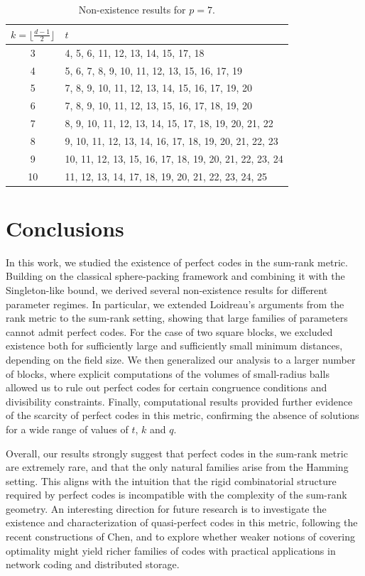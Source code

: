 \documentclass[11pt]{amsart}
\theoremstyle{definition}
\begin{document}
\begin{table}[ht] 
    \centering
\begin{tabular}{|c|p{}|}
	\hline
	$k=\lfloor \frac{d-1}2\rfloor$ & $t$ \\
	\hline
	3 & 4, 5, 6, 11, 12, 13, 14, 15, 17, 18 \\
	\hline
	4 & 5, 6, 7, 8, 9, 10, 11, 12, 13, 15, 16, 17, 19 \\
	\hline
	5 & 7, 8, 9, 10, 11, 12, 13, 14, 15, 16, 17, 19, 20 \\
	\hline
	6 & 7, 8, 9, 10, 11, 12, 13, 15, 16, 17, 18, 19, 20 \\
	\hline
	7 & 8, 9, 10, 11, 12, 13, 14, 15, 17, 18, 19, 20, 21, 22 \\
	\hline
	8 & 9, 10, 11, 12, 13, 14, 16, 17, 18, 19, 20, 21, 22, 23 \\
	\hline
	9 & 10, 11, 12, 13, 15, 16, 17, 18, 19, 20, 21, 22, 23, 24 \\
	\hline
	10 & 11, 12, 13, 14, 17, 18, 19, 20, 21, 22, 23, 24, 25 \\
	\hline
\end{tabular}
    \caption{Non-existence results for $p=7$.}
    \label{table:p=7}
\end{table}

\section{Conclusions}

In this work, we studied the existence of perfect codes in the sum-rank metric. Building on the classical sphere-packing framework and combining it with the Singleton-like bound, we derived several non-existence results for different parameter regimes. In particular, we extended Loidreau’s arguments from the rank metric to the sum-rank setting, showing that large families of parameters cannot admit perfect codes. For the case of two square blocks, we excluded existence both for sufficiently large and sufficiently small minimum distances, depending on the field size. We then generalized our analysis to a larger number of blocks, where explicit computations of the volumes of small-radius balls allowed us to rule out perfect codes for certain congruence conditions and divisibility constraints. Finally, computational results provided further evidence of the scarcity of perfect codes in this metric, confirming the absence of solutions for a wide range of values of $t$, $k$ and $q$.

Overall, our results strongly suggest that perfect codes in the sum-rank metric are extremely rare, and that the only natural families arise from the Hamming setting. This aligns with the intuition that the rigid combinatorial structure required by perfect codes is incompatible with the complexity of the sum-rank geometry. An interesting direction for future research is to investigate the existence and characterization of quasi-perfect codes in this metric, following the recent constructions of Chen, and to explore whether weaker notions of covering optimality might yield richer families of codes with practical applications in network coding and distributed storage.
\end{document}
